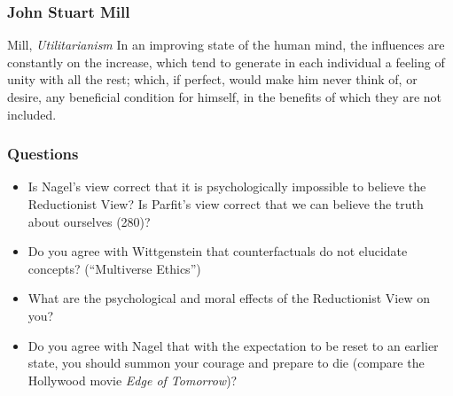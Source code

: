 \documentclass[xcolor=dvipsnames]{beamer}
\begin{document}
\begin{frame}
  \frametitle{John Stuart Mill}
  \begin{block}{Mill, \emph{Utilitarianism}}
    In an improving state of the human mind, the influences are
    constantly on the increase, which tend to generate in each
    individual a feeling of unity with all the rest; which, if
    perfect, would make him never think of, or desire, any beneficial
    condition for himself, in the benefits of which they are not
    included.
  \end{block}
\end{frame}

\begin{frame}
  \frametitle{Questions}
  \begin{itemize}
  \item Is Nagel's view correct that it is psychologically impossible
    to believe the Reductionist View? Is Parfit's view correct that we
    can believe the truth about ourselves (280)?
  \item Do you agree with Wittgenstein that counterfactuals do not
    elucidate concepts? (``Multiverse Ethics'')
  \item What are the psychological and moral effects of the
    Reductionist View on you?
  \item Do you agree with Nagel that with the expectation to be reset
    to an earlier state, you should summon your courage and prepare to
    die (compare the Hollywood movie \emph{Edge of Tomorrow})?
  \end{itemize}
\end{frame}

\end{document}
